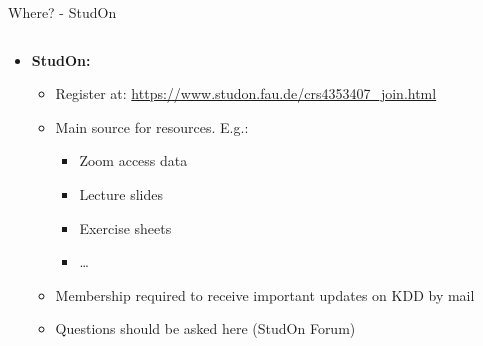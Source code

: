 \begin{frame}{Where? - StudOn}
	\begin{columns}
		\begin{column}{0.7\textwidth}
			\begin{itemize}
				\item \textbf{StudOn:}
				      \begin{itemize}
					      \item Register at: \url{https://www.studon.fau.de/crs4353407_join.html}
					      \item Main source for resources. E.g.:
					            \begin{itemize}
						            \item Zoom access data
						            \item Lecture slides
						            \item Exercise sheets
						            \item \ldots
					            \end{itemize}
					      \item Membership required to receive important updates on KDD by mail
					      \item Questions should be asked here (StudOn Forum)
				      \end{itemize}
			\end{itemize}
		\end{column}
		\begin{column}{0.3\textwidth}
			\begin{center}
			\end{center}
		\end{column}
	\end{columns}

\end{frame}


